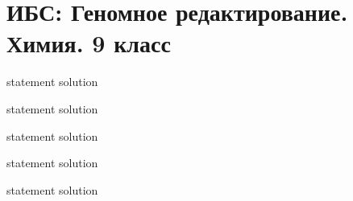 \chapter{ИБС: Геномное редактирование. Химия. 9 класс}

{statement}
{solution}

{statement}
{solution}

{statement}
{solution}

{statement}
{solution}

{statement}
{solution}